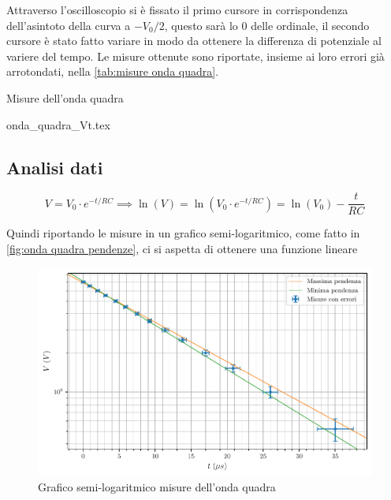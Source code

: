 \documentclass[11pt, a4paper]{article}
\numberwithin{equation}{section} %
\begin{document}
Attraverso l'oscilloscopio si è fissato il primo cursore in corrispondenza dell'asintoto della curva a \(- V_{0}/2\), questo sarà lo \(0\) delle ordinale, il secondo cursore è stato fatto variare in modo da ottenere la differenza di potenziale al variere del tempo. Le misure ottenute sono riportate, insieme ai loro errori già arrotondati, nella \autoref{tab:misure onda quadra}.


\begin{table}[ht!]
    \centering
    \caption{Misure dell'onda quadra}
    {onda_quadra_Vt.tex}
    \label{tab:misure onda quadra}
\end{table}

\subsection{Analisi dati}

\begin{equation*}
    V = V_{0} \cdot e^{-t/RC} \implies \ln(V) = \ln(V_{0} \cdot e^{-t/RC}) = \ln(V_{0}) - \frac{t}{RC}
\end{equation*}

Quindi riportando le misure in un grafico semi-logaritmico, come fatto in \autoref{fig:onda quadra pendenze}, ci si aspetta di ottenere una funzione lineare

\begin{figure}[ht!]
    \includegraphics{onda_quadra_V(t)_pendenze.pdf}
    \caption{Grafico semi-logaritmico misure dell'onda quadra}
    \label{fig:onda quadra pendenze}
\end{figure}
\end{document}
